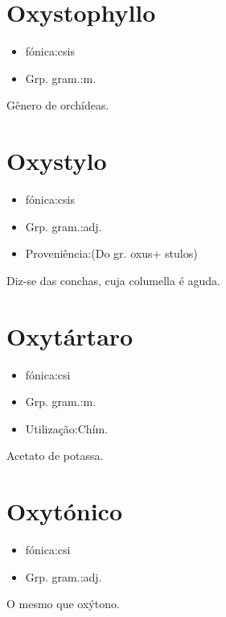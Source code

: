 \section{Oxystophyllo}
\begin{itemize}
\item {fónica:csis}
\end{itemize}
\begin{itemize}
\item {Grp. gram.:m.}
\end{itemize}
Gênero de orchídeas.
\section{Oxystylo}
\begin{itemize}
\item {fónica:csis}
\end{itemize}
\begin{itemize}
\item {Grp. gram.:adj.}
\end{itemize}
\begin{itemize}
\item {Proveniência:(Do gr. \textunderscore oxus\textunderscore  + \textunderscore stulos\textunderscore )}
\end{itemize}
Diz-se das conchas, cuja columella é aguda.
\section{Oxytártaro}
\begin{itemize}
\item {fónica:csi}
\end{itemize}
\begin{itemize}
\item {Grp. gram.:m.}
\end{itemize}
\begin{itemize}
\item {Utilização:Chím.}
\end{itemize}
Acetato de potassa.
\section{Oxytónico}
\begin{itemize}
\item {fónica:csi}
\end{itemize}
\begin{itemize}
\item {Grp. gram.:adj.}
\end{itemize}
O mesmo que \textunderscore oxýtono\textunderscore .
